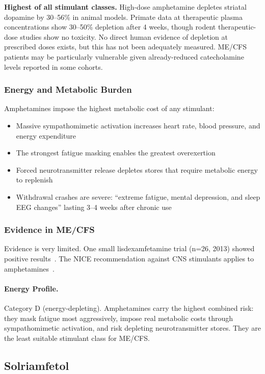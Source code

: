 \textbf{Highest of all stimulant classes.} High-dose amphetamine depletes striatal dopamine by 30--56\% in animal models. Primate data at therapeutic plasma concentrations show 30--50\% depletion after 4 weeks, though rodent therapeutic-dose studies show no toxicity. No direct human evidence of depletion at prescribed doses exists, but this has not been adequately measured. ME/CFS patients may be particularly vulnerable given already-reduced catecholamine levels reported in some cohorts.

\subsubsection{Energy and Metabolic Burden}

Amphetamines impose the highest metabolic cost of any stimulant:
\begin{itemize}
    \item Massive sympathomimetic activation increases heart rate, blood pressure, and energy expenditure
    \item The strongest fatigue masking enables the greatest overexertion
    \item Forced neurotransmitter release depletes stores that require metabolic energy to replenish
    \item Withdrawal crashes are severe: ``extreme fatigue, mental depression, and sleep EEG changes'' lasting 3--4 weeks after chronic use
\end{itemize}

\subsubsection{Evidence in ME/CFS}

Evidence is very limited. One small lisdexamfetamine trial (n=26, 2013) showed positive results~\cite{Young2013lisdexamfetamine}.
The NICE recommendation against CNS stimulants applies to amphetamines~\cite{NICE2021mecfs}.

\paragraph{Energy Profile.}
Category D (energy-depleting). Amphetamines carry the highest combined risk: they mask fatigue most aggressively, impose real metabolic costs through sympathomimetic activation, and risk depleting neurotransmitter stores. They are the least suitable stimulant class for ME/CFS.

\subsection{Solriamfetol}
\label{subsec:solriamfetol}

